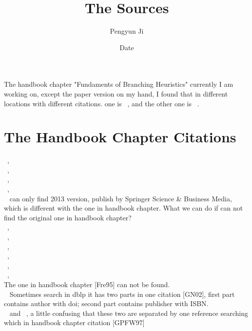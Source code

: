 \documentclass[11pt]{article}
\begin{document}
\title{The Sources}
\author{Pengyun Ji}
\date{Date}
\maketitle

 The handbook chapter "Fundaments of Branching Heuristics" currently I am working on, except the paper version on my hand, I found that in different locations with different citations. one is ~\cite{kullmann2009fundaments}, and the other one is ~\cite{DBLP:series/faia/Kullmann09}.


\begin{comment}
The one ~\cite{kullmann2009fundaments} is found on google scholar, the one ~\cite{DBLP:series/faia/Kullmann09} is found on dblp.
Not know which citation can be officially used in paper.
\end{comment}


\section{The Handbook Chapter Citations}

\begin{comment}
Here I enter into the references in the handbook chapter.
But the formats of references are different due to using different searching engines.
Some links of the article can be open but some can not since it needs to buy. The question is same as beginning: which are offical in general paper/article?
\end{comment}
~\cite{andrew1983handbook},\\
~\cite{DBLP:conf/sat/BjesseKDSZ03},\\
~\cite{beame2004towards},\\
~\cite{DBLP:journals/rsa/BraunsteinMZ05},\\
~\cite{bullen2013handbook} can only find 2013 version, publish by Springer Science \& Business Media, which is different with the one in handbook chapter. What we can do if can not find the original one in handbook chapter?\\
~\cite{cull2005difference},\\
~\cite{dubois1993sat},\\
~\cite{DBLP:journals/talg/Eppstein06},\\
~\cite{DBLP:conf/sat/EenS03},\\
~\cite{DBLP:journals/eatcs/FominGK05},\\
~\cite{DBLP:journals/jucs/FrancoKSWDV04},\\
The one in handbook chapter [Fre95] can not be found.\\
~\cite{DBLP:conf/date/GoldbergN02} Sometimes search in dblp it has two parts in one citation [GN02], first part contains author with doi; second part contains publisher with ISBN.\\
~\cite{gu1996algorithms} and ~\cite{du1997satisfiability}, a little confusing that these two are separated by one reference searching which in handbook chapter citation [GPFW97]
\end{document}
